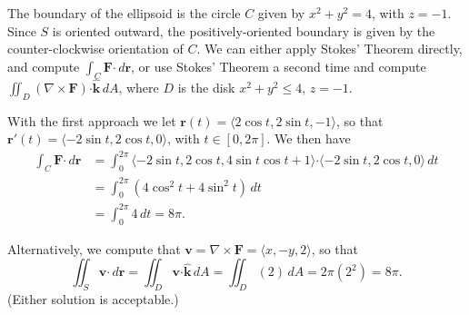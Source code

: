\documentclass[12pt]{article}
\renewcommand{\r}{\mathbf{r}}
\newcommand{\dotp}{\boldsymbol{\cdot}}
\newcommand{\F}{\mathbf{F}}
\newcommand{\kvec}{\hat{\mathbf{k}}}
\begin{document}
\begin{enumerate}
\bigskip

The boundary of the ellipsoid is the circle $C$ given by $x^2+y^2=4$, with $z=-1$. Since $S$ is oriented outward, the positively-oriented boundary is given by the counter-clockwise orientation of $C$. We can either apply Stokes' Theorem directly, and compute $\int_C \F\dotp\,d\r$, or use Stokes' Theorem a second time and compute $\iint_D (\nabla\times\F)\dotp\kvec\,dA$, where $D$ is the disk $x^2+y^2\leq 4$, $z=-1$. 

With the first approach we let $\r(t) = \langle 2\cos t, 2\sin t, -1\rangle$, so that $\r'(t) = \langle -2\sin t, 2\cos t, 0\rangle$, with $t\in [0,2\pi]$. We then have
\begin{align*}
\int_C\F\dotp\,d\r &= \int_0^{2\pi} \langle -2\sin t, 2\cos t, 4\sin t\cos t+1\rangle\dotp\langle -2\sin t, 2\cos t, 0\rangle\,dt\\
& = \int_0^{2\pi} (4\cos^2t+4\sin^2t)\,dt\\
& = \int_0^{2\pi}4\,dt = 8\pi.
\end{align*}

Alternatively, we compute that $\mathbf{v} = \nabla\times\F = \langle x, -y, 2\rangle$, so that
\[
\iint_S\mathbf{v}\dotp\,d\r = \iint_D\mathbf{v}\dotp\kvec\,dA = \iint_D (2)\,dA = 2\pi(2^2) = 8\pi.
\]
(Either solution is acceptable.)
\end{enumerate}
\end{document}
